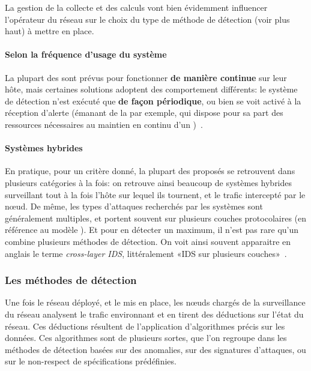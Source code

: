 La gestion de la collecte et des calculs vont bien évidemment influencer l'opérateur du réseau sur le choix du type de méthode de détection (voir plus haut) à mettre en place.

        \paragraph{Selon la fréquence d'usage du système}
La plupart des \IDS sont prévus pour fonctionner \textbf{de manière continue} sur leur hôte, mais certaines solutions adoptent des comportement différents: le système de détection n'est exécuté que \textbf{de façon périodique}, ou bien se voit activé à la réception d'alerte (émanant de la \sdb par exemple, qui dispose pour sa part des ressources nécessaires au maintien en continu d'un \IDS)~\cite{BMS13}.

        \paragraph{Systèmes hybrides}
En pratique, pour un critère donné, la plupart des \IDS proposés se retrouvent dans plusieurs catégories à la fois: on retrouve ainsi beaucoup de systèmes hybrides surveillant tout à la fois l'hôte sur lequel ils tournent, et le trafic intercepté par le nœud.
De même, les types d'attaques recherchés par les systèmes sont généralement multiples, et portent souvent sur plusieurs couches protocolaires (en référence au modèle \tcpip).
Et pour en détecter un maximum, il n'est pas rare qu'un \IDS combine plusieurs méthodes de détection.
On voit ainsi souvent apparaitre en anglais le terme \textit{cross-layer IDS}, littéralement «IDS sur plusieurs couches»~\cite{BMS13}.

    \subsubsection{Les méthodes de détection}\label{ea:sss:detect}
Une fois le réseau déployé, et le \ids mis en place, les nœuds chargés de la surveillance du réseau analysent le trafic environnant et en tirent des déductions sur l'état du réseau.
Ces déductions résultent de l'application d'algorithmes précis sur les données.
Ces algorithmes sont de plusieurs sortes, que l'on regroupe dans les méthodes de détection basées sur des anomalies, sur des signatures d'attaques, ou sur le non-respect de spécifications prédéfinies.

